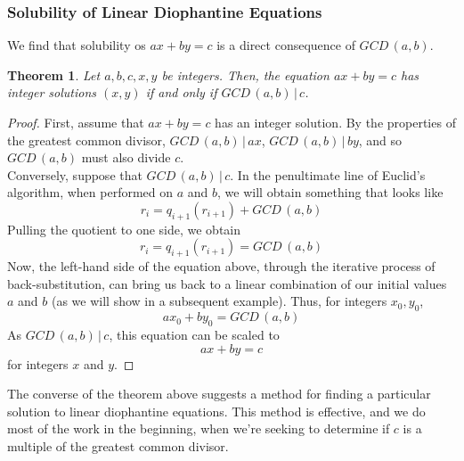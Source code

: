 \documentclass{article}
\newtheorem{theorem}{Theorem}
\newcommand{\divv}{\,|\,}
\newcommand{\GCD}[2]{GCD\,(#1, #2)}
\begin{document}
\subsubsection*{Solubility of Linear Diophantine Equations} 
We find that solubility os $ax + by = c$ is a direct consequence of $\GCD{a}{b}$. 
\begin{mdframed} 
\begin{theorem} 
Let $a, b, c, x, y$ be integers. Then, the equation $ax + by = c$ has integer solutions $(x, y)$ if and only if $\GCD{a}{b}\divv c$. 
\end{theorem} 
\begin{proof} 
First, assume that $ax + by = c$ has an integer solution. By the properties of the greatest common divisor, $\GCD{a}{b}\divv ax$, $\GCD{a}{b}\divv by$, and so $\GCD{a}{b}$ must also divide $c$. \\
Conversely, suppose that $\GCD{a}{b}\divv c$. In the penultimate line of Euclid's algorithm, when performed on $a$ and $b$, we will obtain something that looks like 
\[r_i = q_{i+1}(r_{i+1}) + \GCD{a}{b}\]
Pulling the quotient to one side, we obtain 
\[r_i = q_{i+1}(r_{i+1}) = \GCD{a}{b}\]
Now, the left-hand side of the equation above, through the iterative process of back-substitution, can bring us back to a linear combination of our initial values $a$ and $b$ (as we will show in a subsequent example). Thus, for integers $x_0, y_0$, 
\[ax_0 + by_0 = \GCD{a}{b}\]
As $\GCD{a}{b}\divv c$, this equation can be scaled to 
\[ax + by = c\]
for integers $x$ and $y$. 
\end{proof} 
\end{mdframed} 
The converse of the theorem above suggests a method for finding a particular solution to linear diophantine equations. This method is effective, and we do most of the work in the beginning, when we're seeking to determine if $c$ is a multiple of the greatest common divisor.  
\end{document}
